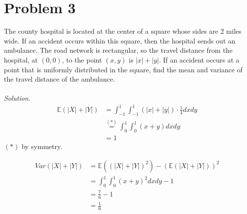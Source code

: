 \documentclass{article}
\newcommand{\E}{\mathbb{E}}
\begin{document}
\section*{Problem 3}
The county hospital is located at the center of a square whose sides are 2 miles wide. If an accident occurs within this square, then the hospital sends out an ambulance. The road network is rectangular, so the travel distance from the hospital, at $(0,0)$, to the point $(x,y)$ is $|x|+|y|$. If an accident occurs at a point that is uniformly distributed in the square, find the mean and variance of the travel distance of the ambulance.\\\\
\color{blue}
\textit{Solution. }
\begin{equation*}
    \begin{split}
        \E(|X|+|Y|) &= \int_{-1}^1\int_{-1}^1(|x|+|y|)\cdot \frac{1}{4} dxdy\\
        &\stackrel{(*)}{=}\int_0^1\int_0^1(x+y)dxdy\\
        &= 1
    \end{split}
\end{equation*}
$(*)$ by symmetry.

\begin{equation*}
    \begin{split}
        Var(|X|+|Y|) &= \E((|X|+|Y|)^2)-(\E(|X|+|Y|))^2\\
            &= \int_0^1\int_0^1(x+y)^2dxdy -1\\
            &= \frac{7}{6} - 1\\
            &=\frac{1}{6}
    \end{split}
\end{equation*}
\color{black}
\end{document}
